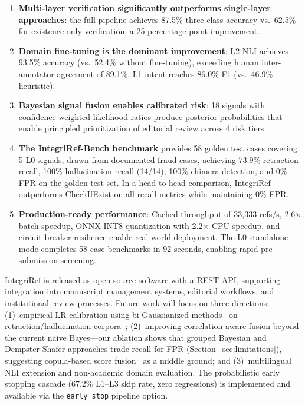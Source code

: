\documentclass[sigconf,nonacm]{acmart}
\begin{document}
\begin{enumerate}
    \item \textbf{Multi-layer verification significantly outperforms single-layer approaches}: the full pipeline achieves 87.5\% three-class accuracy vs.\ 62.5\% for existence-only verification, a 25-percentage-point improvement.

    \item \textbf{Domain fine-tuning is the dominant improvement}: L2 NLI achieves 93.5\% accuracy (vs.\ 52.4\% without fine-tuning), exceeding human inter-annotator agreement of 89.1\%. L1 intent reaches 86.0\% F1 (vs.\ 46.9\% heuristic).

    \item \textbf{Bayesian signal fusion enables calibrated risk}: 18 signals with confidence-weighted likelihood ratios produce posterior probabilities that enable principled prioritization of editorial review across 4 risk tiers.

    \item \textbf{The IntegriRef-Bench benchmark} provides 58 golden test cases covering 5 L0 signals, drawn from documented fraud cases, achieving 73.9\% retraction recall, 100\% hallucination recall (14/14), 100\% chimera detection, and 0\% FPR on the golden test set. In a head-to-head comparison, IntegriRef outperforms CheckIfExist on all recall metrics while maintaining 0\% FPR.

    \item \textbf{Production-ready performance}: Cached throughput of 33,333 refs/s, 2.6$\times$ batch speedup, ONNX INT8 quantization with 2.2$\times$ CPU speedup, and circuit breaker resilience enable real-world deployment. The L0 standalone mode completes 58-case benchmarks in 92 seconds, enabling rapid pre-submission screening.
\end{enumerate}

IntegriRef is released as open-source software with a REST API, supporting integration into manuscript management systems, editorial workflows, and institutional review processes.
Future work will focus on three directions:
(1)~empirical LR calibration using bi-Gaussianized methods~\cite{morrison2024} on retraction/hallucination corpora~\cite{akritidis2025};
(2)~improving correlation-aware fusion beyond the current naive Bayes---our ablation shows that grouped Bayesian and Dempster-Shafer approaches trade recall for FPR (Section~\ref{sec:limitations}), suggesting copula-based score fusion~\cite{chen2025copula} as a middle ground; and
(3)~multilingual NLI extension and non-academic domain evaluation.
The probabilistic early stopping cascade (67.2\% L1--L3 skip rate, zero regressions) is implemented and available via the \texttt{early\_stop} pipeline option.
\end{document}
